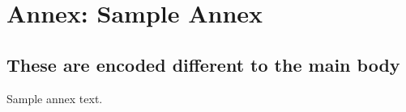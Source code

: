 \chapter*{Annex: Sample Annex}

\renewcommand{\thetable}{A.\arabic{table}}
\renewcommand{\thefigure}{A.\arabic{figure}}
\setcounter{table}{0}
\setcounter{figure}{0}


\section*{These are encoded different to the main body}
Sample annex text.

